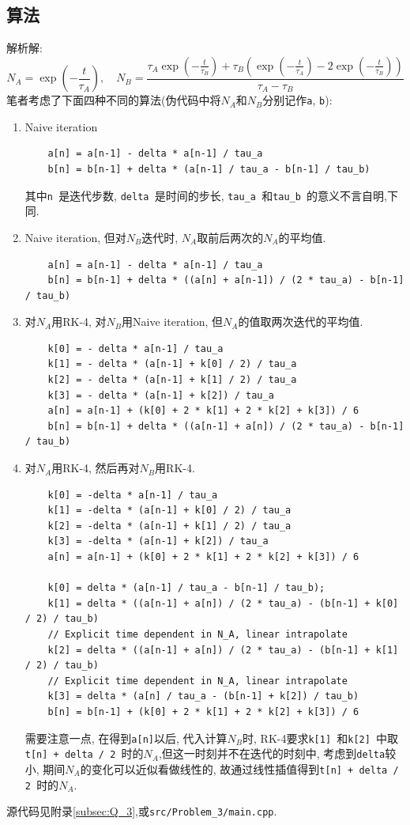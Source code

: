 \documentclass[UTF-8]{article}
\begin{document}
\subsection{算法}
解析解: 
\begin{equation}
	N_A=\exp(-\frac{t}{\tau_{A}}),\quad N_B=\frac{\tau_{A}\exp(-\frac{t}{\tau_{B}})+\tau_{B}(\exp(-\frac{t}{\tau_{A}})-2\exp(-\frac{t}{\tau_{B}}))}{\tau_{A}-\tau_{B}}
\end{equation}
笔者考虑了下面四种不同的算法(伪代码中将$N_A$和$N_B$分别记作\texttt{a}, \texttt{b}): 
\begin{enumerate}
\item Naive iteration
\begin{lstlisting}
	a[n] = a[n-1] - delta * a[n-1] / tau_a
	b[n] = b[n-1] + delta * (a[n-1] / tau_a - b[n-1] / tau_b)
\end{lstlisting}
其中\texttt{n }是迭代步数, \texttt{delta }是时间的步长, \texttt{tau\_a }和\texttt{tau\_b }的意义不言自明,下同.
\item Naive iteration, 但对$N_B$迭代时, $N_A$取前后两次的$N_A$的平均值.
\begin{lstlisting}
	a[n] = a[n-1] - delta * a[n-1] / tau_a
	b[n] = b[n-1] + delta * ((a[n] + a[n-1]) / (2 * tau_a) - b[n-1] / tau_b)
\end{lstlisting}
\item 对$N_A$用RK-4, 对$N_B$用Naive iteration, 但$N_A$的值取两次迭代的平均值.
\begin{lstlisting}
	k[0] = - delta * a[n-1] / tau_a
	k[1] = - delta * (a[n-1] + k[0] / 2) / tau_a
	k[2] = - delta * (a[n-1] + k[1] / 2) / tau_a
	k[3] = - delta * (a[n-1] + k[2]) / tau_a
	a[n] = a[n-1] + (k[0] + 2 * k[1] + 2 * k[2] + k[3]) / 6
	b[n] = b[n-1] + delta * ((a[n-1] + a[n]) / (2 * tau_a) - b[n-1] / tau_b)
\end{lstlisting}
\item 对$N_A$用RK-4, 然后再对$N_B$用RK-4.
\begin{lstlisting}
	k[0] = -delta * a[n-1] / tau_a
	k[1] = -delta * (a[n-1] + k[0] / 2) / tau_a
	k[2] = -delta * (a[n-1] + k[1] / 2) / tau_a
	k[3] = -delta * (a[n-1] + k[2]) / tau_a
	a[n] = a[n-1] + (k[0] + 2 * k[1] + 2 * k[2] + k[3]) / 6

	k[0] = delta * (a[n-1] / tau_a - b[n-1] / tau_b);
	k[1] = delta * ((a[n-1] + a[n]) / (2 * tau_a) - (b[n-1] + k[0] / 2) / tau_b)
	// Explicit time dependent in N_A, linear intrapolate
	k[2] = delta * ((a[n-1] + a[n]) / (2 * tau_a) - (b[n-1] + k[1] / 2) / tau_b)
	// Explicit time dependent in N_A, linear intrapolate
	k[3] = delta * (a[n] / tau_a - (b[n-1] + k[2]) / tau_b)
	b[n] = b[n-1] + (k[0] + 2 * k[1] + 2 * k[2] + k[3]) / 6
\end{lstlisting}
需要注意一点, 在得到\texttt{a[n]}以后, 代入计算$N_B$时, RK-4要求\texttt{k[1] }和\texttt{k[2] }中取\\ \texttt{t[n] + delta / 2 }时的$N_A$,但这一时刻并不在迭代的时刻中, 考虑到\texttt{delta}较小, 期间$N_A$的变化可以近似看做线性的, 故通过线性插值得到\texttt{t[n] + delta / 2 }时的$N_A$.
\end{enumerate}
源代码见附录\ref{subsec:Q_3},或\texttt{src/Problem\_3/main.cpp}.
\end{document}
